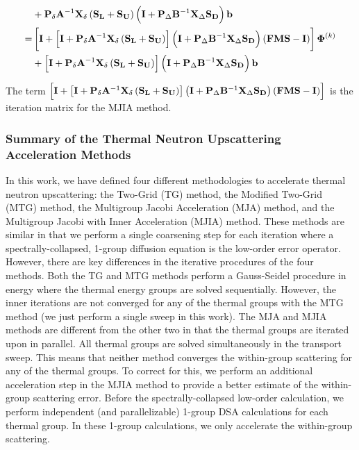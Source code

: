 \begin{equation}
\begin{aligned}
&+ {\bf P}_{\delta}{\bf A}^{-1}  {\bf X}_{\delta}\left(   {\bf S_L} +  {\bf S_U} \right) \left(  {\bf I} + {\bf P}_{\Delta} {\bf B}^{-1} {\bf X}_{\Delta} {\bf S_D} \right) {\bf b} \\
=& \left[ {\bf I} +\left[ {\bf I}+ {\bf P}_{\delta}{\bf A}^{-1}  {\bf X}_{\delta}\left(   {\bf S_L} +  {\bf S_U} \right) \right]    \left(  {\bf I} + {\bf P}_{\Delta} {\bf B}^{-1} {\bf X}_{\Delta} {\bf S_D} \right) \left(   {\bf F}  {\bf M} {\bf S}  - {\bf I} \right)   \right]{\bf \Phi}^{(k)} \\
&+  \left[ {\bf I}+ {\bf P}_{\delta}{\bf A}^{-1}  {\bf X}_{\delta}\left(   {\bf S_L} +  {\bf S_U} \right) \right]  \left(  {\bf I} + {\bf P}_{\Delta} {\bf B}^{-1} {\bf X}_{\Delta} {\bf S_D} \right) {\bf b} \\
\end{aligned}
\end{equation}

\noindent The term $\left[ {\bf I} +\left[ {\bf I}+ {\bf P}_{\delta}{\bf A}^{-1}  {\bf X}_{\delta}\left(   {\bf S_L} +  {\bf S_U} \right) \right]    \left(  {\bf I} + {\bf P}_{\Delta} {\bf B}^{-1} {\bf X}_{\Delta} {\bf S_D} \right) \left(   {\bf F}  {\bf M} {\bf S}  - {\bf I} \right)   \right]$ is the iteration matrix for the MJIA method.


\subsubsection{Summary of the Thermal Neutron Upscattering Acceleration Methods}
\label{sec:DSA_DSA_MG_Summary}

In this work, we have defined four different methodologies to accelerate thermal neutron upscattering: the Two-Grid (TG) method, the Modified Two-Grid (MTG) method, the Multigroup Jacobi Acceleration (MJA) method, and the Multigroup Jacobi with Inner Acceleration (MJIA) method. These methods are similar in that we perform a single coarsening step for each iteration where a spectrally-collapsed, 1-group diffusion equation is the low-order error operator. However, there are key differences in the iterative procedures of the four methods. Both the TG and MTG methods perform a Gauss-Seidel procedure in energy where the thermal energy groups are solved sequentially. However, the inner iterations are not converged for any of the thermal groups with the MTG method (we just perform a single sweep in this work). The MJA and MJIA methods are different from the other two in that the thermal groups are iterated upon in parallel. All thermal groups are solved simultaneously in the transport sweep. This means that neither method converges the within-group scattering for any of the thermal groups. To correct for this, we perform an additional acceleration step in the MJIA method to provide a better estimate of the within-group scattering error. Before the spectrally-collapsed low-order calculation, we perform independent (and parallelizable) 1-group DSA calculations for each thermal group. In these 1-group calculations, we only accelerate the within-group scattering.

